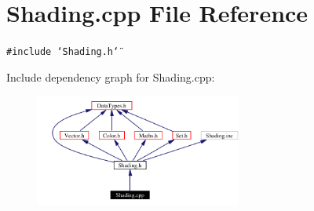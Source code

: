 \section{Shading.cpp File Reference}
\label{Shading_8cpp}
{\tt \#include \char`\"{}Shading.h\char`\"{}}\par


Include dependency graph for Shading.cpp:\begin{figure}[H]
\begin{center}
\leavevmode
\includegraphics[width=192pt]{Shading_8cpp__incl}
\end{center}
\end{figure}
